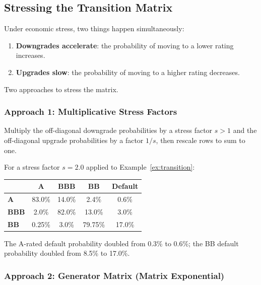 \documentclass[11pt, a4paper]{article}
\theoremstyle{definition}
\theoremstyle{plain}
\theoremstyle{remark}
\begin{document}
\subsection{Stressing the Transition Matrix}

Under economic stress, two things happen simultaneously:
\begin{enumerate}
    \item \textbf{Downgrades accelerate}: the probability of moving to a lower rating increases.
    \item \textbf{Upgrades slow}: the probability of moving to a higher rating decreases.
\end{enumerate}

Two approaches to stress the matrix.

\subsubsection{Approach 1: Multiplicative Stress Factors}

Multiply the off-diagonal downgrade probabilities by a stress factor $s > 1$
and the off-diagonal upgrade probabilities by a factor $1/s$,
then rescale rows to sum to one.

For a stress factor $s = 2.0$ applied to Example~\ref{ex:transition}:

\begin{center}
\begin{tabular}{@{}lcccc@{}}
\toprule
& \textbf{A} & \textbf{BBB} & \textbf{BB} & \textbf{Default} \\
\midrule
\textbf{A}   & 83.0\% & 14.0\% & 2.4\% & 0.6\% \\
\textbf{BBB} & 2.0\%  & 82.0\% & 13.0\% & 3.0\% \\
\textbf{BB}  & 0.25\% & 3.0\%  & 79.75\% & 17.0\% \\
\bottomrule
\end{tabular}
\end{center}

The A-rated default probability doubled from 0.3\% to 0.6\%;
the BB default probability doubled from 8.5\% to 17.0\%.

\subsubsection{Approach 2: Generator Matrix (Matrix Exponential)}
\end{document}
